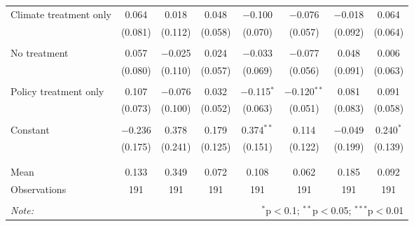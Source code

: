 \begin{tabular}{@{\extracolsep{5pt}}lccccccc}
 Climate treatment only & 0.064 & 0.018 & 0.048 & $-$0.100 & $-$0.076 & $-$0.018 & 0.064 \\ 
  & (0.081) & (0.112) & (0.058) & (0.070) & (0.057) & (0.092) & (0.064) \\ 
  & & & & & & & \\ 
 No treatment & 0.057 & $-$0.025 & 0.024 & $-$0.033 & $-$0.077 & 0.048 & 0.006 \\ 
  & (0.080) & (0.110) & (0.057) & (0.069) & (0.056) & (0.091) & (0.063) \\ 
  & & & & & & & \\ 
 Policy treatment only & 0.107 & $-$0.076 & 0.032 & $-$0.115$^{*}$ & $-$0.120$^{**}$ & 0.081 & 0.091 \\ 
  & (0.073) & (0.100) & (0.052) & (0.063) & (0.051) & (0.083) & (0.058) \\ 
  & & & & & & & \\ 
 Constant & $-$0.236 & 0.378 & 0.179 & 0.374$^{**}$ & 0.114 & $-$0.049 & 0.240$^{*}$ \\ 
  & (0.175) & (0.241) & (0.125) & (0.151) & (0.122) & (0.199) & (0.139) \\ 
  & & & & & & & \\ 
\hline \\[-1.8ex] 
Mean & 0.133 & 0.349 & 0.072 & 0.108 & 0.062 & 0.185 & 0.092 \\ 
Observations & 191 & 191 & 191 & 191 & 191 & 191 & 191 \\ 
\hline 
\hline \\[-1.8ex] 
\textit{Note:}  & \multicolumn{7}{r}{$^{*}$p$<$0.1; $^{**}$p$<$0.05; $^{***}$p$<$0.01} \\ 
\end{tabular} 
